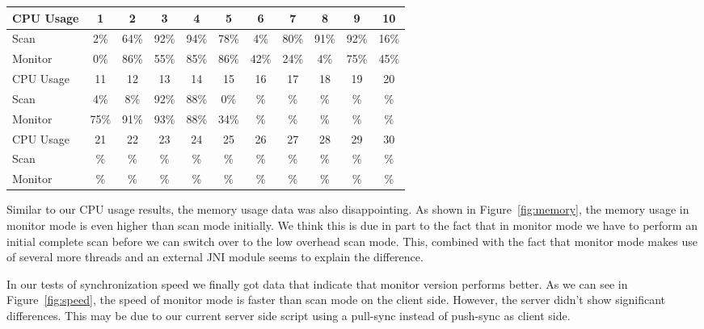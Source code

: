 \begin{center}
  \begin{tabular}{ | l || c | c | c | c | c | c | c | c | c | c | }
    \hline
CPU Usage& 1  & 2	 & 3 	& 4 	& 5 	& 6 	& 7 	& 8 	& 9 	& 10	 	\\ \hline\hline
Scan	& 2\% & 64\% & 92\%	& 94\% 	& 78\% 	& 4\%	& 80\%	& 91\%	& 92\%	& 16\% 	  	\\ \hline
Monitor	& 0\% & 86\% & 55\%	& 85\% 	& 86\% 	& 42\%	& 24\%	& 4\%	& 75\%	& 45\% 		\\ \hline\hline

CPU Usage& 11 & 12	 & 13	& 14	& 15	& 16 	& 17 	& 18 	& 19 	& 20 		\\ \hline\hline
Scan	& 4\% & 8\%	 & 92\%	& 88\% 	& 0\% 	& \%	& \%	& \%	& \%	& \%  		\\ \hline
Monitor	&75\% & 91\% & 93\%	& 88\%	& 34\% 	& \%	& \%	& \%	& \%	& \%  		\\ \hline\hline

CPU Usage& 21 & 22	 & 23	& 24	& 25	& 26 	& 27 	& 28 	& 29 	& 30 		\\ \hline\hline
Scan	& \% & \%	 & \%	& \% 	& \% 	& \%	& \%	& \%	& \%	& \%  		\\ \hline
Monitor	& \% & \% 	 & \%	& \%	& \% 	& \%	& \%	& \%	& \%	& \%  		\\ \hline\hline
  \end{tabular}
\end{center}




Similar to our CPU usage results, the memory usage data was also disappointing. As shown in Figure~\ref{fig:memory}, the memory usage in monitor mode is even higher than scan mode initially. We think this is due in part to the fact that in monitor mode we have to perform an initial complete scan before we can switch over to the low overhead scan mode.  This, combined with the fact that monitor mode makes use of several more threads and an external JNI module seems to explain the difference.


In our tests of synchronization speed we finally got data that indicate that monitor version performs better. 
As we can see in Figure~\ref{fig:speed}, the speed of monitor mode is faster than scan mode on the client side. However, the 
server didn't show significant differences. This may be due to our current server side script using a pull-sync instead of push-sync as client side.

